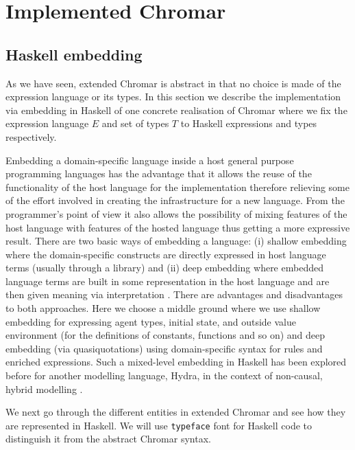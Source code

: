 \documentclass[phd]{infthesis}
\begin{document}
\chapter{Implemented Chromar}
\section{Haskell embedding}
\label{sec:impl}
As we have seen, extended Chromar is abstract in that no choice is made of the
expression language or its types. In this section we describe the implementation
via embedding in Haskell of one concrete realisation of Chromar where we fix the
expression language $E$ and set of types $T$ to Haskell expressions and types
respectively.

Embedding a domain-specific language inside a host general purpose programming
languages has the advantage that it allows the reuse of the functionality of the
host language for the implementation therefore relieving some of the effort
involved in creating the infrastructure for a new language. From the
programmer's point of view it also allows the possibility of mixing features of
the host language with features of the hosted language thus getting a more
expressive result. There are two basic ways of embedding a language: (i) shallow
embedding where the domain-specific constructs are directly expressed in host
language terms (usually through a library) and (ii) deep embedding where
embedded language terms are built in some representation in the host language
and are then given meaning via interpretation \citep{hudak_modular_1998}. There
are advantages and disadvantages to both approaches. Here we choose a middle
ground where we use shallow embedding for expressing agent types, initial state,
and outside value environment (for the definitions of constants, functions and
so on) and deep embedding (via quasiquotations) using domain-specific syntax for
rules and enriched expressions. Such a mixed-level embedding in Haskell has been
explored before for another modelling language, Hydra, in the context of
non-causal, hybrid modelling \citep{giorgidze_mixed-level_2010}.

We next go through the different entities in extended Chromar and see how they
are represented in Haskell. We will use \texttt{typeface} font for Haskell code
to distinguish it from the abstract Chromar syntax.
\end{document}
